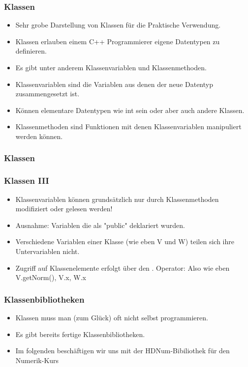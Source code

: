 
\begin{frame}[fragile]
\frametitle{Klassen}
\begin{itemize}
\item Sehr grobe Darstellung von Klassen für die Praktische Verwendung.
\item Klassen erlauben einem C++ Programmierer eigene Datentypen zu definieren.
\item Es gibt unter anderem Klassenvariablen und Klassenmethoden.
\item Klassenvariablen sind die Variablen aus denen der neue Datentyp zusammengesetzt ist.
\item Können elementare Datentypen wie int sein oder aber auch andere Klassen.
\item Klassenmethoden sind Funktionen mit denen Klassenvariablen manipuliert werden können.
\end{itemize}
\end{frame}


\begin{frame}
\frametitle{Klassen}

\end{frame}



\begin{frame}[fragile]
\frametitle{Klassen III}
\begin{itemize}
\item Klassenvariablen können grundsätzlich nur durch Klassenmethoden modifiziert oder gelesen werden!
\item Ausnahme: Variablen die als "public" deklariert wurden.
\item Verschiedene Variablen einer Klasse (wie eben V und W) teilen sich ihre Untervariablen nicht.
\item Zugriff auf Klassenelemente erfolgt über den . Operator: Also wie eben V.getNorm(), V.x, W.x
\end{itemize}
\end{frame}

\begin{frame}[fragile]
\frametitle{Klassenbibliotheken}
\begin{itemize}
\item Klassen muss man (zum Glück) oft nicht selbst programmieren.
\item Es gibt bereits fertige Klassenbibliotheken.
\item Im folgenden beschäftigen wir uns mit der HDNum-Bibiliothek für den Numerik-Kurs
\end{itemize}
\end{frame}

